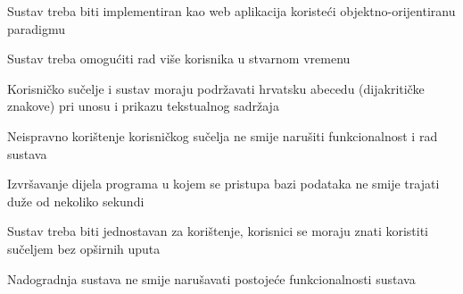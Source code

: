 			 \begin{packed_item}
			 \item Sustav treba biti implementiran kao web aplikacija koristeći objektno-orijentiranu paradigmu
			 \item Sustav treba omogućiti rad više korisnika u stvarnom vremenu
			 \item Korisničko sučelje i sustav moraju podržavati hrvatsku abecedu (dijakritičke znakove) pri unosu i prikazu tekstualnog sadržaja
			 \item  Neispravno korištenje korisničkog sučelja ne smije narušiti funkcionalnost i rad sustava

			 \item Izvršavanje dijela programa u kojem se pristupa bazi podataka ne smije trajati duže od nekoliko sekundi
			 \item Sustav treba biti jednostavan za korištenje, korisnici se moraju znati koristiti sučeljem bez opširnih uputa
			 \item Nadogradnja sustava ne smije narušavati postojeće funkcionalnosti sustava
			\end{packed_item}
		\eject